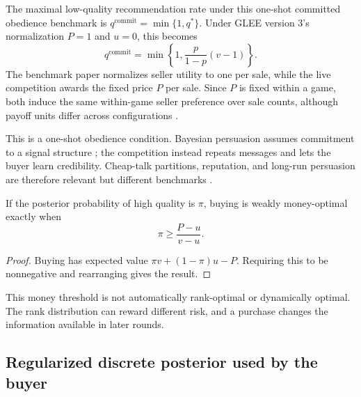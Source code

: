 The maximal low-quality recommendation rate under this one-shot committed
obedience benchmark is $q^{\mathrm{commit}}=\min\{1,q^*\}$. Under GLEE version
3's normalization $P=1$ and $u=0$, this becomes
\begin{equation}
q^{\mathrm{commit}}=\min\left\{1,\frac{p}{1-p}(v-1)\right\}.
\end{equation}
The benchmark paper normalizes seller utility to one per sale, while the live
competition awards the fixed price $P$ per sale. Since $P$ is fixed within a
game, both induce the same within-game seller preference over sale counts,
although payoff units differ across configurations \citep{shapira2024glee}.

This is a one-shot obedience condition. Bayesian persuasion assumes commitment
to a signal structure \citep{kamenica2011bayesian}; the competition instead
repeats messages and lets the buyer learn credibility. Cheap-talk partitions,
reputation, and long-run persuasion are therefore relevant but different
benchmarks
\citep{crawford1982strategic,sobel1985credibility,kreps1982reputation,fudenberg1989reputation,best2024longrun}.

\begin{proposition}
If the posterior probability of high quality is $\pi$, buying is weakly
money-optimal exactly when
\[
\pi\geq\frac{P-u}{v-u}.
\]
\end{proposition}
\begin{proof}
Buying has expected value $\pi v+(1-\pi)u-P$. Requiring this to be nonnegative
and rearranging gives the result.
\end{proof}

This money threshold is not automatically rank-optimal or dynamically optimal.
The rank distribution can reward different risk, and a purchase changes the
information available in later rounds.

\subsection{Regularized discrete posterior used by the buyer}

